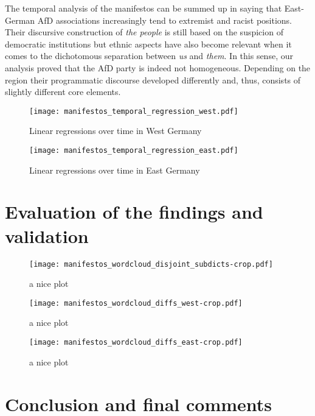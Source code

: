 \documentclass[a4paper]{scrreprt}
\begin{document}
The temporal analysis of the manifestos can be summed up in saying that East-German AfD associations increasingly tend to extremist and racist positions. Their discursive construction of {\em the people} is still based on the suspicion of democratic institutions but ethnic aspects have also become relevant when it comes to the dichotomous separation between {\em us} and {\em them}. In this sense, our analysis proved that the AfD party is indeed not homogeneous. Depending on the region their programmatic discourse developed differently and, thus, consists of slightly different core elements.
\begin{figure}[ht]
    \centering
    \texttt{[image: manifestos\_temporal\_regression\_west.pdf]}
    \caption{Linear regressions over time in West Germany}
    \label{fig:fig7}
\end{figure}
\begin{figure}[ht]
    \centering
    \texttt{[image: manifestos\_temporal\_regression\_east.pdf]}
    \caption{Linear regressions over time in East Germany}
    \label{fig:fig8}
\end{figure}
\chapter{Evaluation of the findings and validation}
\begin{figure}
    \centering
    \texttt{[image: manifestos\_wordcloud\_disjoint\_subdicts-crop.pdf]}
    \caption{a nice plot}
    \label{fig:fig9}
\end{figure}
\begin{figure}
    \centering
    \begin{minipage}{.5\textwidth}
        \centering
        \texttt{[image: manifestos\_wordcloud\_diffs\_west-crop.pdf]}
        \caption{a nice plot}
        \label{fig:fig10}
    \end{minipage}%
    \begin{minipage}{.5\textwidth}
        \centering
        \texttt{[image: manifestos\_wordcloud\_diffs\_east-crop.pdf]}
        \caption{a nice plot}
        \label{fig:fig11}
    \end{minipage}
\end{figure}
\chapter{Conclusion and final comments}


\end{document}
